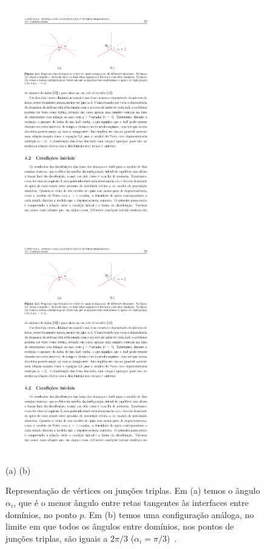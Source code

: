 \begin{figure}
 \centering
 \includegraphics[width=70mm]{img/gauss_bonnet1.pdf}
 \includegraphics[width=70mm]{img/gauss_bonnet2.pdf} \\
 (a) \hspace{60mm} (b)
 \caption{Representação de vértices ou junções triplas. Em (a) temos o ângulo $\alpha_i$, que é o menor ângulo entre retas tangentes às interfaces entre domínios, no ponto $p$. Em (b) temos uma configuração análoga, no limite em que todos os ângulos entre domínios, nos pontos de junções triplas, são iguais a $2\pi/3$ ($\alpha_i = \pi/3$)~\cite{TeseMP}.}
 \label{fig.GaussBonnet}
\end{figure}

